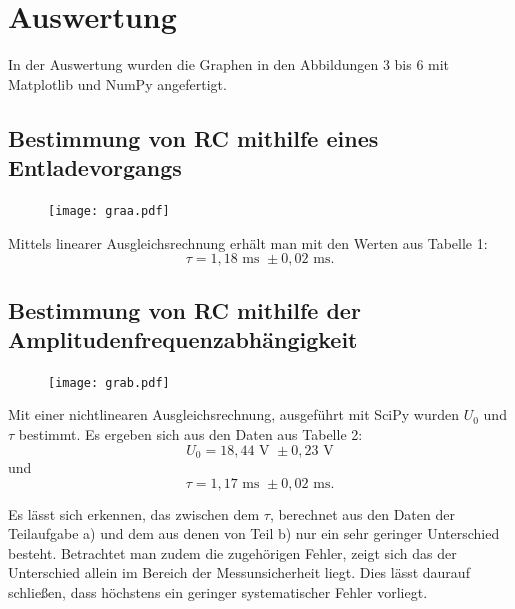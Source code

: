 \section{Auswertung}
\label{sec:Auswertung}
In der Auswertung wurden die Graphen in den Abbildungen 3 bis 6 mit Matplotlib \cite{matplotlib} und NumPy \cite{numpy} angefertigt.

\subsection{Bestimmung von RC mithilfe eines Entladevorgangs}
\begin{figure}[H]
	\centering
	\caption{}
	\texttt{[image: graa.pdf]}
	\label{fig:graa}
\end{figure}


Mittels linearer Ausgleichsrechnung erhält man mit den Werten aus Tabelle 1:
\begin{displaymath}
\tau = 1,18 \text{ ms } \pm 0,02 \text{ ms.} 
\end{displaymath}
\subsection{Bestimmung von RC mithilfe der Amplitudenfrequenzabhängigkeit}
\begin{figure}[H]
	\centering
	\caption{}
	\texttt{[image: grab.pdf]}
	\label{fig:grab}
\end{figure}
Mit einer nichtlinearen Ausgleichsrechnung, ausgeführt mit SciPy \cite{scipy} wurden $U_0$ und $\tau$ bestimmt. Es ergeben sich aus den Daten aus Tabelle 2:
\begin{displaymath}
U_0 = 18,44 \text{ V } \pm 0,23 \text{ V}
\end{displaymath}
und
\begin{displaymath}
\tau = 1,17  \text{ ms } \pm 0,02 \text{ ms.}
\end{displaymath}




Es lässt sich erkennen, das zwischen dem $\tau$, berechnet aus den Daten der
 Teilaufgabe a) und dem aus denen von Teil b) nur ein sehr geringer Unterschied
  besteht. Betrachtet man zudem die zugehörigen Fehler, zeigt sich das der
	Unterschied allein im Bereich der Messunsicherheit liegt. Dies lässt daurauf
	 schließen, dass höchstens ein geringer systematischer Fehler vorliegt.

